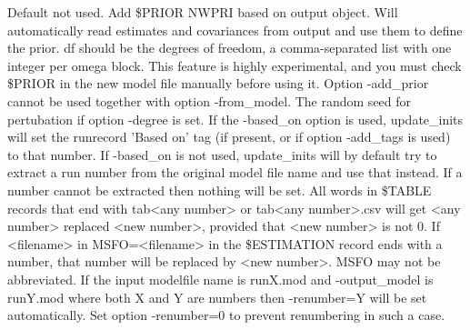 \begin{optionlist}
\nextopt
{}
Default not used. Add \$PRIOR NWPRI based on output object. Will automatically read
estimates and covariances from output and use them to define the 
prior. df should be the degrees of freedom, a comma-separated list
with one integer per omega block.
This feature is highly experimental, and you must check \$PRIOR 
in the new model file manually before using it.
Option -add\_prior cannot be used together with option -from\_model. 
\nextopt
{}
The random seed for pertubation if option -degree is set.
\nextopt
{}
If the -based\_on option is used, update\_inits will set 
the runrecord 'Based on' tag (if present, or if option -add\_tags is used) 
to that number. 
If -based\_on is not used, update\_inits will by default try to extract 
a run number from the original model file name and use that instead.
If a number cannot be extracted then nothing will be set. 
\nextopt
{}
All words in \$TABLE records that end with tab<any number> 
or tab<any number>.csv will get <any number> replaced 
<new number>, provided that <new number> is not 0.
If <filename> in MSFO=<filename> in the  \$ESTIMATION record
ends with a number, that number will be replaced by <new number>.
MSFO may not be abbreviated.
If the input modelfile name is runX.mod and -output\_model is runY.mod
where both X and Y are numbers then -renumber=Y will be set automatically.
Set option -renumber=0 to prevent renumbering in such a case.
\nextopt
\end{optionlist}


